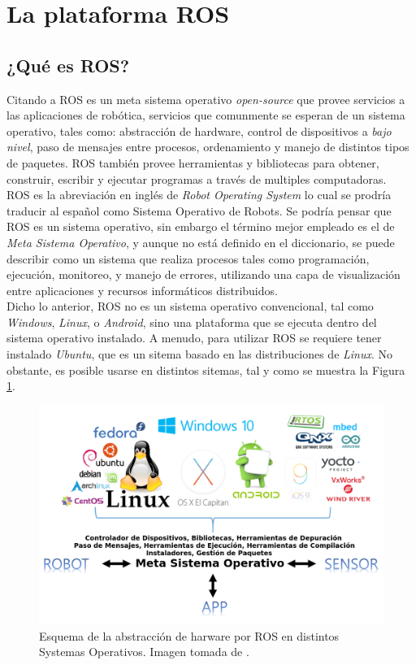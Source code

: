 	\section{La plataforma ROS}
		\subsection*{¿Qué es ROS?}
Citando a \cite{pyo2015ros} ROS es un meta sistema operativo \textit{open-source} que provee servicios a las aplicaciones de robótica, servicios que comunmente se esperan de un sistema operativo, tales como: abstracción de hardware, control de dispositivos a \textit{bajo nivel}, paso de mensajes entre procesos, ordenamiento y manejo de distintos tipos de paquetes. ROS también provee herramientas y bibliotecas para obtener, construir, escribir y ejecutar programas a través de multiples computadoras.\\

ROS es la abreviación en inglés de \textit{Robot Operating System} lo cual se prodría traducir al español como Sistema Operativo de Robots. Se podría pensar que ROS es un sistema operativo, sin embargo el término mejor empleado es el de \textit{Meta Sistema Operativo}, y aunque no está definido en el diccionario, se puede describir como un sistema que realiza procesos tales como programación, ejecución, monitoreo, y manejo de errores, utilizando una capa de visualización entre aplicaciones y recursos informáticos distribuidos.\\

Dicho lo anterior, ROS no es un sistema operativo convencional, tal como \textit{Windows}, \textit{Linux}, o \textit{Android}, sino una plataforma que se ejecuta dentro del sistema operativo instalado. A menudo, para utilizar ROS se requiere tener instalado \textit{Ubuntu}, que es un sitema basado en las distribuciones de \textit{Linux}. No obstante, es posible usarse en distintos sitemas, tal y como se muestra la Figura \ref{fig:meta_operating_system}. 
\begin{figure}
\centering
\includegraphics[scale=0.5]{images/meta_operating_system.png}
\caption{Esquema de la abstracción de harware por ROS en distintos Systemas Operativos. Imagen tomada de \cite{pyo2015ros}.}
\label{fig:meta_operating_system}
\end{figure} 

